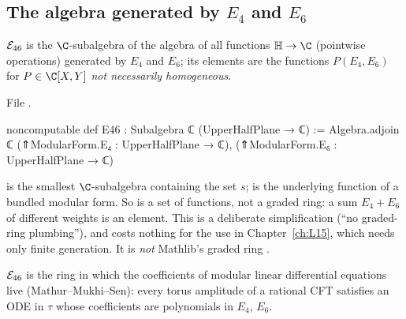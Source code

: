 \subsection{The algebra generated by \texorpdfstring{$E_4$}{E4} and \texorpdfstring{$E_6$}{E6}}

\begin{definition}[$\lfourteenE$]\label{l14:def:E46}
$\lfourteenE$ is the $\C$-subalgebra of the algebra of all functions $\lfourteenH\to\C$ (pointwise operations) generated
by $E_4$ and $E_6$; its elements are the functions $P(E_4,E_6)$ for $P\in\C[X,Y]$ \emph{not necessarily homogeneous}.
\end{definition}
\noindent File .
\begin{leancode}
noncomputable def E46 : Subalgebra ℂ (UpperHalfPlane → ℂ) :=
  Algebra.adjoin ℂ {(⇑ModularForm.E₄ : UpperHalfPlane → ℂ), (⇑ModularForm.E₆ : UpperHalfPlane → ℂ)}
\end{leancode}
\begin{dictionary}
 is the smallest $\C$-subalgebra containing the set $s$;  is the underlying function of a
bundled modular form. So  is a set of functions, not a graded ring: a sum $E_4 + E_6$ of different weights is an
element. This is a deliberate simplification (``no graded-ring plumbing''), and costs nothing for the use in
Chapter~\ref{ch:L15}, which needs only finite generation. It is \emph{not} Mathlib's graded ring .
\end{dictionary}
\begin{physics}
$\lfourteenE$ is the ring in which the coefficients of modular linear differential equations live (Mathur--Mukhi--Sen): every
torus amplitude of a rational CFT satisfies an ODE in $\tau$ whose coefficients are polynomials in $E_4$, $E_6$.
\end{physics}

